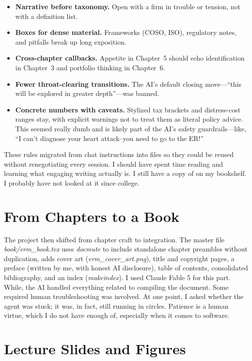 \documentclass[11pt,letterpaper]{article}
\begin{document}
\begin{itemize}[leftmargin=*]
  \item \textbf{Narrative before taxonomy.} Open with a firm in trouble or tension, not with a definition list.
  \item \textbf{Boxes for dense material.} Frameworks (COSO, ISO), regulatory notes, and pitfalls break up long exposition.
  \item \textbf{Cross-chapter callbacks.} Appetite in Chapter~5 should echo identification in Chapter~3 and portfolio thinking in Chapter~6.
  \item \textbf{Fewer throat-clearing transitions.} The AI's default closing move---``this will be explored in greater depth''---was banned.
  \item \textbf{Concrete numbers with caveats.} Stylized tax brackets and distress-cost ranges stay, with explicit warnings not to treat them as literal policy advice. This seemed really dumb and is likely part of the AI's safety guardrails—like, ``I can't diagnose your heart attack--you need to go to the ER!''
\end{itemize}

These rules migrated from chat instructions into files so they could be reused without renegotiating every session. I should have spent time reading and learning what engaging writing actually is. I still have a copy of \cite{StrunkWhite} on my bookshelf. I probably have not looked at it since college. 

\section{From Chapters to a Book}

The project then shifted from chapter craft to integration. The master file \textit{book/erm\_book.tex} uses \textit{docmute} to include standalone chapter preambles without duplication, adds cover art (\textit{erm\_cover\_art.png}), title and copyright pages, a preface (written by me, with honest AI disclosure), table of contents, consolidated bibliography, and an index (\textit{makeindex}). I used Claude Fable 5 for this part. While, the AI handled everything related to compiling the document. Some required human troubleshooting was involved. At one point, I asked whether the agent was stuck; it was, in fact, still running in circles. Patience is a human virtue, which I do not have enough of, especially when it comes to software.

\section{Lecture Slides and Figures}
\end{document}
